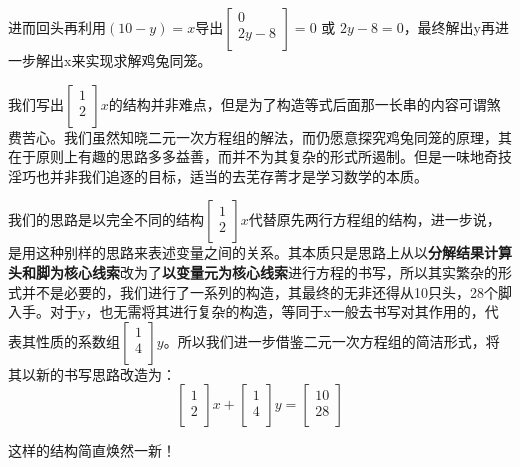 \documentclass[fontset=none]{ctexart}
\begin{document}
进而回头再利用$(10-y)=x$导出$\left[ \begin{array}{c}
	0\\
	2y-8\\
\end{array} \right] =0$ 或 $2y-8=0$，最终解出y再进一步解出x来实现求解鸡兔同笼。

我们写出$\left[ \begin{array}{c}
	1\\
	2\\
\end{array} \right] x$的结构并非难点，但是为了构造等式后面那一长串的内容可谓煞费苦心。我们虽然知晓二元一次方程组的解法，而仍愿意探究鸡兔同笼的原理，其在于原则上有趣的思路多多益善，而并不为其复杂的形式所遏制。但是一味地奇技淫巧也并非我们追逐的目标，适当的去芜存菁才是学习数学的本质。

我们的思路是以完全不同的结构$\left[ \begin{array}{c}
	1\\
	2\\
\end{array} \right] x$代替原先两行方程组的结构，进一步说，是用这种别样的思路来表述变量之间的关系。其本质只是思路上从以\textbf{分解结果计算头和脚为核心线索}改为了\textbf{以变量元为核心线索}进行方程的书写，所以其实繁杂的形式并不是必要的，我们进行了一系列的构造，其最终的无非还得从10只头，28个脚入手。对于y，也无需将其进行复杂的构造，等同于x一般去书写对其作用的，代表其性质的系数组$\left[ \begin{array}{c}
	1\\
	4\\
\end{array} \right] y$。所以我们进一步借鉴二元一次方程组的简洁形式，将其以新的书写思路改造为：
$$
\left[ \begin{array}{c}
	1\\
	2\\
\end{array} \right] x+\left[ \begin{array}{c}
	1\\
	4\\
\end{array} \right] y=\left[ \begin{array}{c}
	10\\
	28\\
\end{array} \right] 
$$

这样的结构简直焕然一新！
\end{document}
